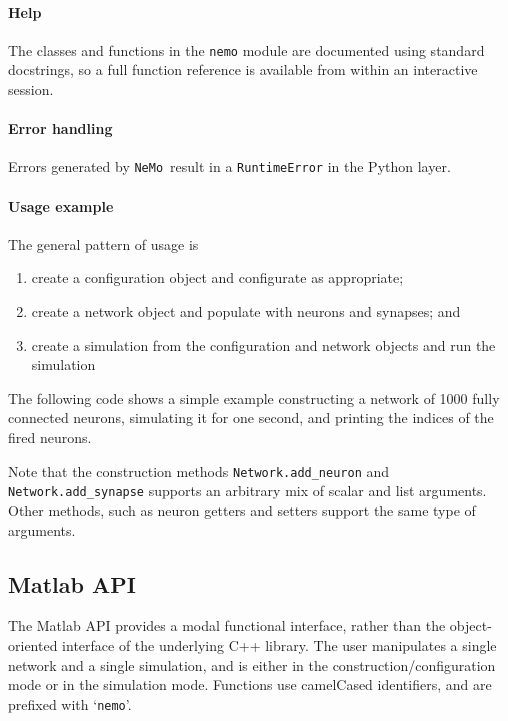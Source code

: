 \documentclass[a4paper]{article}
\newcommand{\nemo}{\texttt{NeMo}}
\newcommand{\code}[1]{\texttt{#1}}
\newcommand{\library}[1]{\texttt{#1}}
\begin{document}
\paragraph{Help}
The classes and functions in the \library{nemo} module are documented using standard docstrings,
	so a full function reference is available from within an interactive session. 

\paragraph{Error handling}
Errors generated by \nemo\ result in a \code{RuntimeError} in the Python layer.

\paragraph{Usage example}
The general pattern of usage is

\begin{enumerate}
	\item create a configuration object and configurate as appropriate;
	\item create a network object and populate with neurons and synapses; and
	\item create a simulation from the configuration and network objects and run the simulation
\end{enumerate}

The following code shows a simple example
    constructing a network of 1000 fully connected neurons,
    simulating it for one second, and
    printing the indices of the fired neurons.



Note that the construction methods
    \code{Network.add\_neuron} and
    \code{Network.add\_synapse}
    supports an arbitrary mix of scalar and list arguments.
Other methods, such as neuron getters and setters support the same type of arguments.

\newpage

\subsection{Matlab API}
\label{api:matlab}

The Matlab API provides a modal functional interface,
	rather than the object-oriented interface of the underlying C++ library.
The user manipulates a single network and a single simulation,
	and is either in the construction/configuration mode or in the simulation mode.
Functions use camelCased identifiers, and are prefixed with `\code{nemo}'.
\end{document}
